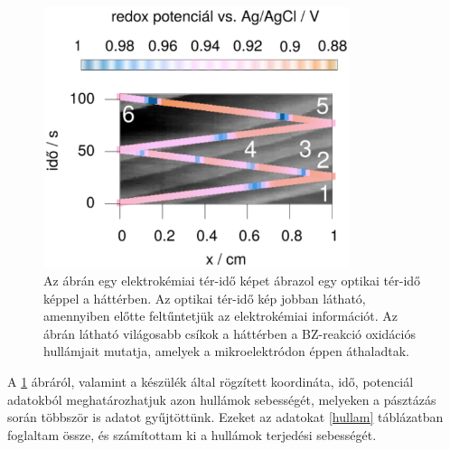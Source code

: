 \begin{figure}
\centering
\includegraphics[width=0.8\textwidth]{img/spacetime2.eps}
\caption{ Az ábrán egy elektrokémiai tér-idő képet ábrazol egy optikai tér-idő képpel a háttérben. Az optikai tér-idő kép jobban látható, amennyiben előtte feltűntetjük az elektrokémiai információt. Az ábrán látható világosabb csíkok a háttérben a BZ-reakció oxidációs hullámjait mutatja, amelyek a mikroelektródon éppen áthaladtak.
}
\label{fig:spatiotemporal}
\end{figure}
A \ref{fig:spatiotemporal} ábráról, valamint a készülék által rögzített koordináta, idő, potenciál adatokból meghatározhatjuk azon hullámok sebességét, melyeken a pásztázás során többször is adatot gyűjtöttünk. Ezeket az adatokat \ref{hullam} táblázatban foglaltam össze, és számítottam ki a hullámok terjedési sebességét.

